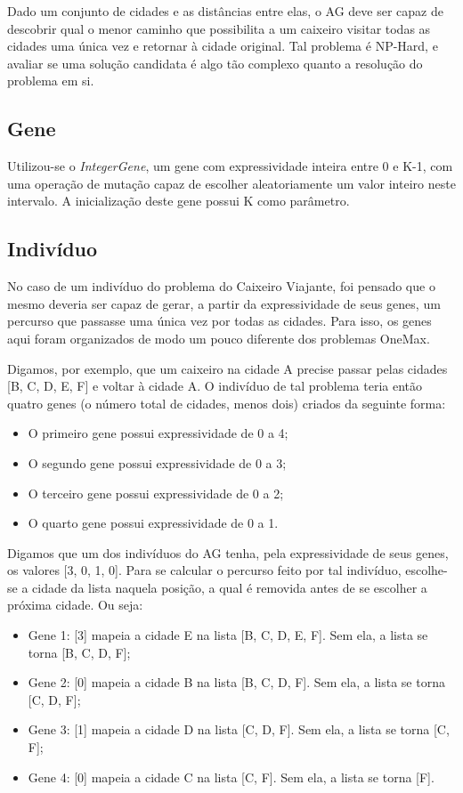Dado um conjunto de cidades e as distâncias entre elas, o AG deve ser capaz de descobrir qual o menor caminho que possibilita a um caixeiro visitar todas as cidades uma única vez e retornar à cidade original. Tal problema é NP-Hard, e avaliar se uma solução candidata é algo tão complexo quanto a resolução do problema em si.

\subsection*{Gene}

Utilizou-se o \emph{IntegerGene}, um gene com expressividade inteira entre 0 e K-1, com uma operação de mutação capaz de escolher aleatoriamente um valor inteiro neste intervalo. A inicialização deste gene possui K como parâmetro.

\subsection*{Indivíduo}

No caso de um indivíduo do problema do Caixeiro Viajante, foi pensado que o mesmo deveria ser capaz de gerar, a partir da expressividade de seus genes, um percurso que passasse uma única vez por todas as cidades. Para isso, os genes aqui foram organizados de modo um pouco diferente dos problemas OneMax.

Digamos, por exemplo, que um caixeiro na cidade A precise passar pelas cidades [B, C, D, E, F] e voltar à cidade A. O indivíduo de tal problema teria então quatro genes (o número total de cidades, menos dois) criados da seguinte forma:

\begin{itemize}
	\item O primeiro gene possui expressividade de 0 a 4;
	\item O segundo gene possui expressividade de 0 a 3;
	\item O terceiro gene possui expressividade de 0 a 2;
	\item O quarto gene possui expressividade de 0 a 1.
\end{itemize}

Digamos que um dos indivíduos do AG tenha, pela expressividade de seus genes, os valores [3, 0, 1, 0]. Para se calcular o percurso feito por tal indivíduo, escolhe-se a cidade da lista naquela posição, a qual é removida antes de se escolher a próxima cidade. Ou seja:

\begin{itemize}
	\item Gene 1: [3] mapeia a cidade E na lista [B, C, D, E, F]. Sem ela, a lista se torna [B, C, D, F];
	\item Gene 2: [0] mapeia a cidade B na lista [B, C, D, F]. Sem ela, a lista se torna [C, D, F];
	\item Gene 3: [1] mapeia a cidade D na lista [C, D, F]. Sem ela, a lista se torna [C, F];
	\item Gene 4: [0] mapeia a cidade C na lista [C, F]. Sem ela, a lista se torna [F].
\end{itemize}

